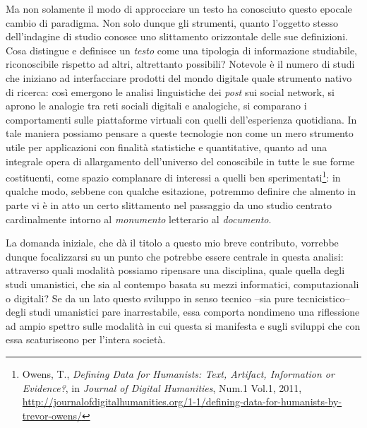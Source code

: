 \documentclass[
  b5paper,
  twoside,
  12pt,
  chapterprefix=false,
  bibliography=totocnumbered,
  parskip=false]{scrbook}
\begin{document}
Ma non solamente il modo di approcciare un testo ha conosciuto questo epocale cambio di paradigma. Non solo dunque gli strumenti, quanto l'oggetto stesso dell'indagine di studio conosce uno slittamento orizzontale delle sue definizioni. Cosa distingue e definisce un \emph{testo} come una tipologia di informazione studiabile, riconoscibile rispetto ad altri, altrettanto possibili? Notevole è il numero di studi che iniziano ad interfacciare prodotti del mondo digitale quale strumento nativo di ricerca: così emergono le analisi linguistiche dei \emph{post} sui social network, si aprono le analogie tra reti sociali digitali e analogiche, si comparano i comportamenti sulle piattaforme virtuali con quelli dell'esperienza quotidiana. In tale maniera possiamo pensare a queste tecnologie non come un mero strumento utile per applicazioni con finalità statistiche e quantitative, quanto ad una integrale opera di allargamento dell'universo del conoscibile in tutte le sue forme costituenti, come spazio complanare di interessi a quelli ben sperimentati\footnote{Owens, T., \emph{Defining Data for Humanists: Text, Artifact, Information or Evidence?}, in \emph{Journal of Digital Humanities}, Num.1 Vol.1, 2011, \url{http://journalofdigitalhumanities.org/1-1/defining-data-for-humanists-by-trevor-owens/}}: in qualche modo, sebbene con qualche esitazione, potremmo definire che almento in parte vi è in atto un certo slittamento nel passaggio da uno studio centrato cardinalmente intorno al \emph{monumento} letterario al \emph{documento}.

La domanda iniziale, che dà il titolo a questo mio breve contributo, vorrebbe dunque focalizzarsi su un punto che potrebbe essere centrale in questa analisi: attraverso quali modalità possiamo ripensare una disciplina, quale quella degli studi umanistici, che sia al contempo basata su mezzi informatici, computazionali o digitali?
Se da un lato questo sviluppo in senso tecnico --sia pure tecnicistico-- degli studi umanistici pare inarrestabile, essa comporta nondimeno una riflessione ad ampio spettro sulle modalità in cui questa si manifesta e sugli sviluppi che con essa scaturiscono per l'intera società.
\end{document}
